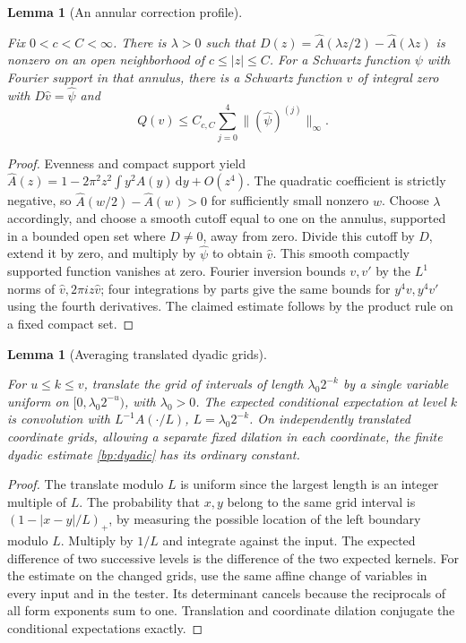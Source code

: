 \documentclass[11pt,letterpaper]{article}
\newtheorem{lemma}[theorem]{Lemma}
\theoremstyle{definition}
\newcommand{\dd}{\,\mathrm d}
\providecommand{\lean}[1]{}
\providecommand{\uses}[1]{}
\begin{document}
\begin{lemma}[An annular correction profile]\label{bp:tent-inverse}
\lean{TwistedParaproduct.tentInverse}
Fix \(0<c<C<\infty\). There is \(\lambda>0\) such that
\(D(z)=\widehat A(\lambda z/2)-\widehat A(\lambda z)\) is nonzero
on an open neighborhood of \(c\le |z|\le C\). For a Schwartz function
\(\psi\) with Fourier support in that annulus, there is a Schwartz
function \(v\) of integral zero with \(D\widehat v=\widehat\psi\) and
\[
 Q(v)\le C_{c,C}\sum_{j=0}^4\|(\widehat\psi)^{(j)}\|_\infty .
\]
\end{lemma}
\begin{proof}
Evenness and compact support yield \(\widehat A(z)=1-
2\pi^2 z^2\int y^2A(y)\dd y+O(z^4)\). The quadratic coefficient is
strictly negative, so \(\widehat A(w/2)-\widehat A(w)>0\) for
sufficiently small nonzero \(w\). Choose \(\lambda\) accordingly, and
choose a smooth cutoff equal to one on the annulus, supported in a
bounded open set where \(D\ne0\), away from zero. Divide this cutoff
by \(D\), extend it by zero, and multiply by \(\widehat\psi\) to
obtain \(\widehat v\). This smooth compactly supported function
vanishes at zero. Fourier inversion bounds \(v,v'\) by the \(L^1\)
norms of \(\widehat v,2\pi iz\widehat v\); four integrations by parts
give the same bounds for \(y^4v,y^4v'\) using the fourth derivatives.
The claimed estimate follows by the product rule on a fixed compact set.
\end{proof}

\begin{lemma}[Averaging translated dyadic grids]\label{bp:random-grid}
\lean{TwistedParaproduct.randomGrid}
For \(u\le k\le v\), translate the grid of intervals of length
\(\lambda_0 2^{-k}\) by a single variable uniform on
\([0,\lambda_0 2^{-u})\), with \(\lambda_0>0\).
The expected conditional expectation at level \(k\) is convolution
with \(L^{-1}A(\cdot/L)\), \(L=\lambda_0 2^{-k}\).
On independently translated coordinate grids, allowing a separate
fixed dilation in each coordinate, the finite dyadic estimate
\ref{bp:dyadic} has its ordinary constant.
\end{lemma}
\begin{proof}
\uses{bp:dyadic}
The translate modulo \(L\) is uniform since the largest length is an
integer multiple of \(L\). The probability that \(x,y\) belong to the
same grid interval is \((1-|x-y|/L)_+\), by measuring the possible
location of the left boundary modulo \(L\). Multiply by \(1/L\) and
integrate against the input. The expected difference of two successive
levels is the difference of the two expected kernels. For the estimate
on the changed grids, use the same affine change of variables in
every input and in the tester. Its determinant cancels because the
reciprocals of all form exponents sum to one. Translation and
coordinate dilation conjugate the conditional expectations exactly.
\end{proof}
\end{document}
